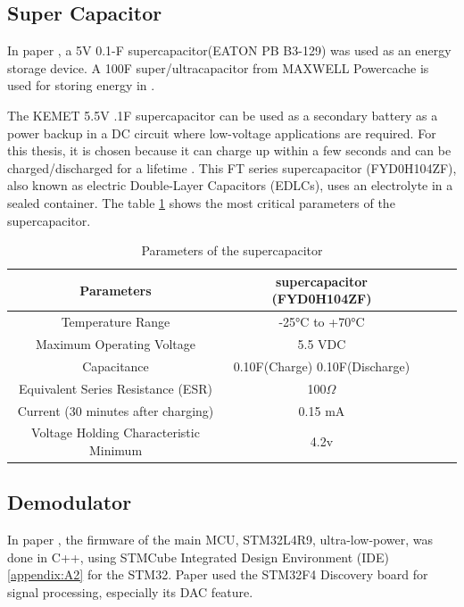 \subsection{Super Capacitor}

In paper \cite{de2024reconfigurable}, a 5V 0.1-F supercapacitor(EATON PB B3-129) was used as an energy storage device. A 100F super/ultracapacitor from MAXWELL Powercache is used for storing energy in \cite{simjee2006everlast}.

The KEMET 5.5V .1F supercapacitor can be used as a secondary battery as a power backup in a DC circuit where low-voltage applications are required. For this thesis, it is chosen because it can charge up within a few seconds and can be charged/discharged for a lifetime \cite{supercap}. This FT series supercapacitor (FYD0H104ZF), also known as electric Double-Layer Capacitors (EDLCs), uses an electrolyte in a sealed container. The table \ref{tab:4.7} shows the most critical parameters of the supercapacitor.

\begin{table}
    \centering
    \caption{Parameters of the supercapacitor}
    \begin{tabular}{|c|c|c|c|c|}
         \hline
         \textbf{Parameters} &\textbf{supercapacitor (FYD0H104ZF)}  \\
         \hline
         Temperature Range  &-25°C to +70°C  \\
         \hline
         Maximum Operating Voltage  &5.5 VDC  \\
         \hline
         Capacitance  &0.10F(Charge) 0.10F(Discharge) \\
         \hline
         Equivalent Series Resistance (ESR) &100\(\Omega\)  \\
         \hline
         Current (30 minutes after charging)  &0.15 mA   \\
         \hline
         Voltage Holding Characteristic Minimum  & 4.2v \\
         \hline
    \end{tabular}
    \label{tab:4.7}
\end{table}


\subsection{Demodulator}

In paper \cite{de2024reconfigurable}, the firmware of the main \ac{MCU}, STM32L4R9, ultra-low-power, was done in C++, using STMCube Integrated Design Environment (IDE)\ref{appendix:A2} for the STM32. Paper \cite{7420990} used the STM32F4 Discovery board for signal processing, especially its DAC feature. 

